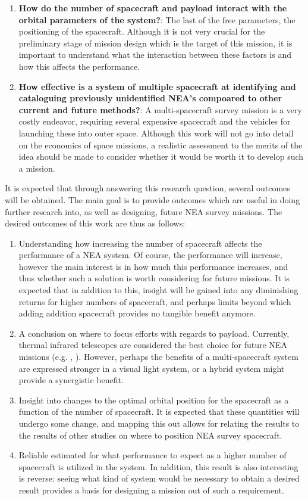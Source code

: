 \begin{enumerate}
 \item \textbf{How do the number of spacecraft and payload interact with the orbital parameters of the system?}: The last of the free parameters, the positioning of the spacecraft. Although it is not very crucial for the preliminary stage of mission design which is the target of this mission, it is important to understand what the interaction between these factors is and how this affects the performance.
 \item \textbf{How effective is a system of multiple spacecraft at identifying and cataloguing previously unidentified NEA's compoared to other current and future methods?}: A multi-spacecraft survey mission is a very costly endeavor, requiring several expensive spacecraft and the vehicles for launching these into outer space. Although this work will not go into detail on the economics of space missions, a realistic assessment to the merits of the idea should be made to consider whether it would be worth it to develop such a mission. 
\end{enumerate}

It is expected that through answering this research question, several outcomes will be obtained. The main goal is to provide outcomes which are useful in doing further research into, as well as designing, future NEA survey missions. The desired outcomes of this work are thus as follows:
\begin{enumerate}
 \item Understanding how increasing the number of spacecraft affects the performance of a NEA system. Of course, the performance will increase, however the main interest is in how much this performance increases, and thus whether such a solution is worth considering for future missions. It is expected that in addition to this, insight will be gained into any diminishing returns for higher numbers of spacecraft, and perhaps limits beyond which adding addition spacecraft provides no tangible benefit anymore.
 \item A conclusion on where to focus efforts with regards to payload. Currently, thermal infrared telescopes are considered the best choice for future NEA missions (e.g. \cite{2017NEOSDT}, \cite{ThesisOlga}). However, perhaps the benefits of a multi-spacecraft system are expressed stronger in a visual light system, or a hybrid system might provide a synergistic benefit.
 \item Insight into changes to the optimal orbital position for the spacecraft as a function of the number of spacecraft. It is expected that these quantities will undergo some change, and mapping this out allows for relating the results to the results of other studies on where to position NEA survey spacecraft.
 \item Reliable estimated for what performance to expect as a higher number of spacecraft is utilized in the system. In addition, this result is also interesting is reverse: seeing what kind of system would be necessary to obtain a desired result provides a basis for designing a mission out of such a requirement.
\end{enumerate}


